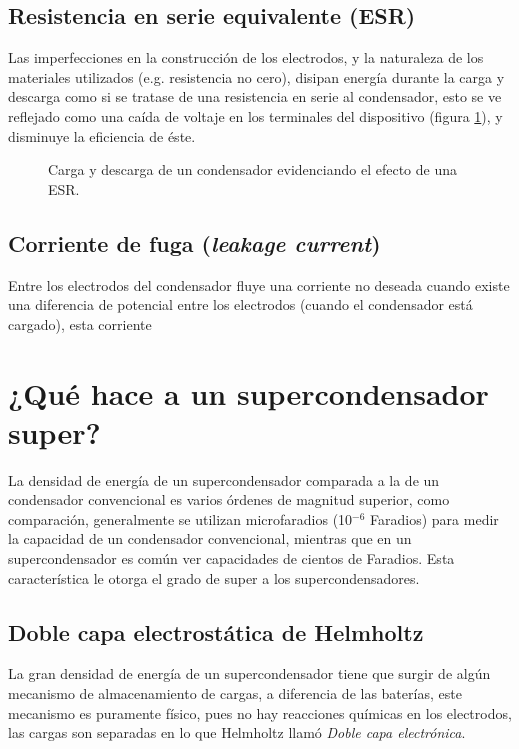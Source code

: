 \subsection{Resistencia en serie equivalente (ESR)}
Las imperfecciones en la construcción de los electrodos, y la naturaleza de los materiales utilizados (e.g. resistencia no cero), disipan energía durante la carga y descarga como si se tratase de una resistencia en serie al condensador, esto se ve reflejado como una caída de voltaje en los terminales del dispositivo (figura \ref{fig:plot:charge-discharge_esr}), y disminuye la eficiencia de éste.

\begin{figure}[h!]
	\caption{Carga y descarga de un condensador evidenciando el efecto de una ESR.}
	\label{fig:plot:charge-discharge_esr}
\end{figure}

\subsection{Corriente de fuga (\emph{leakage current})}
Entre los electrodos del condensador fluye una corriente no deseada cuando existe una diferencia de potencial entre los electrodos (cuando el condensador está cargado), esta corriente 

\section{¿Qué hace a un supercondensador super?}
La densidad de energía de un supercondensador comparada a la de un condensador convencional es varios órdenes de magnitud superior, como comparación, generalmente se utilizan microfaradios (10$^{-6}$ Faradios) para medir la capacidad de un condensador convencional, mientras que en un supercondensador es común ver capacidades de cientos de Faradios. Esta característica le otorga el grado de super a los supercondensadores.

\subsection{Doble capa electrostática de Helmholtz}
La gran densidad de energía de un supercondensador tiene que surgir de algún mecanismo de almacenamiento de cargas, a diferencia de las baterías, este mecanismo es puramente físico, pues no hay reacciones químicas en los electrodos, las cargas son separadas en lo que Helmholtz llamó \textit{Doble capa electrónica}.\citep{Frackowiak2001}

